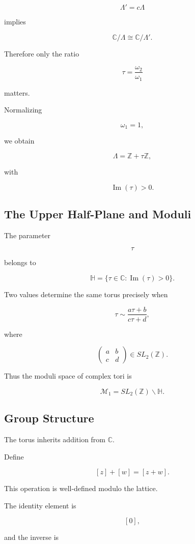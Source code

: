 \documentclass[12pt,a4paper]{article}
\theoremstyle{notespace}
\begin{document}
\[
\Lambda'
=
c\Lambda
\]

implies

\[
\mathbb C/\Lambda
\cong
\mathbb C/\Lambda'.
\]

Therefore only the ratio

\[
\tau
=
\frac{\omega_2}{\omega_1}
\]

matters.

Normalizing

\[
\omega_1=1,
\]

we obtain

\[
\Lambda
=
\mathbb Z+\tau\mathbb Z,
\]

with

\[
\operatorname{Im}(\tau)>0.
\]

\subsection{The Upper Half-Plane and Moduli}

The parameter

\[
\tau
\]

belongs to

\[
\mathbb H
=
\{
\tau\in\mathbb C:
\operatorname{Im}(\tau)>0
\}.
\]

Two values determine the same torus precisely when

\[
\tau
\sim
\frac{a\tau+b}{c\tau+d},
\]

where

\[
\begin{pmatrix}
	a&b\\
	c&d
\end{pmatrix}
\in SL_2(\mathbb Z).
\]

Thus the moduli space of complex tori is

\[
\mathcal M_1
=
SL_2(\mathbb Z)\backslash\mathbb H.
\]

\subsection{Group Structure}

The torus inherits addition from \(\mathbb C\).

Define

\[
[z]+[w]
=
[z+w].
\]

This operation is well-defined modulo the lattice.

The identity element is

\[
[0],
\]

and the inverse is
\end{document}
